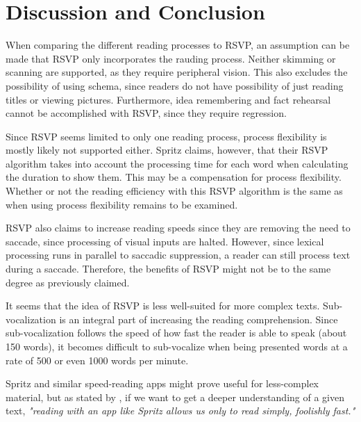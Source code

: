 \section{Discussion and Conclusion}
When comparing the different reading processes to RSVP, an assumption can be made that RSVP only incorporates the rauding process. Neither skimming or scanning are supported, as they require peripheral vision. This also excludes the possibility of using schema, since readers do not have possibility of just reading titles or viewing pictures. Furthermore, idea remembering and fact rehearsal cannot be accomplished with RSVP, since they require regression. 

Since RSVP seems limited to only one reading process, process flexibility is mostly likely not supported either. Spritz claims, however, that their RSVP algorithm takes into account the processing time for each word when calculating the duration to show them. This may be a compensation for process flexibility. Whether or not the reading efficiency with this RSVP algorithm is the same as when using process flexibility remains to be examined.

RSVP also claims to increase reading speeds since they are removing the need to saccade, since processing of visual inputs are halted. However, since lexical processing runs in parallel 
to saccadic suppression, a reader can still process text during a saccade. Therefore, the benefits of RSVP might not be to the same degree as previously claimed.

It seems that the idea of RSVP is less well-suited for more complex texts. Sub-vocalization is an integral part of increasing the reading comprehension. Since sub-vocalization follows the speed of how fast the reader is able to speak (about 150 words), it becomes difficult to sub-vocalize when being presented words at a rate of 500 or even 1000 words per minute. 

Spritz and similar speed-reading apps might prove useful for less-complex material, but as stated by , if we want to get a deeper understanding of a given text, \emph{"reading with an app like Spritz allows us only to read simply, foolishly fast."}


